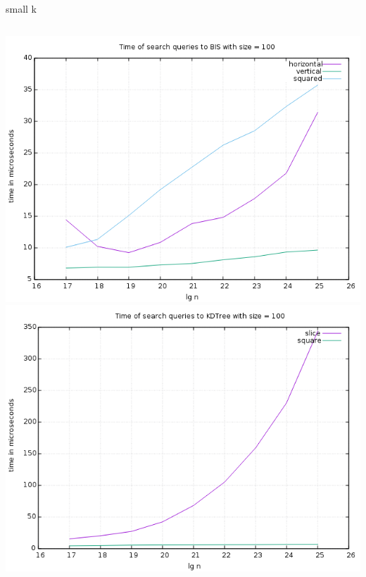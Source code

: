 \documentclass[pdf]{beamer}
\begin{document}
\begin{frame}{small k}
  \begin{columns}
    \includegraphics[scale=0.35]{pictures/analysis/smalls/all_100.png}
    \includegraphics[scale=0.35]{pictures/analysis/smalls/all_kdtree_100_2.png}
  \end{columns}
\end{frame}
\end{document}
